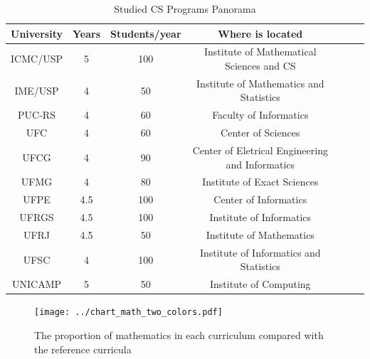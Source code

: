\documentclass{beamer}
\begin{document}
\begin{frame}
\begin{table}
	\scriptsize
	\caption{Studied CS Programs Panorama}
    \begin{tabular}{|c|c|c|c|c|c|c|}
        \hline
        University   & Years & Students/year & Where is located                                   \\ \hline
        \rowcolor{n_green!40}
        ICMC/USP     & 5     & 100   & Institute of Mathematical Sciences and CS        \\ 
        \rowcolor{n_green!40}
        IME/USP      & 4     & 50    & Institute of Mathematics and Statistics          \\ 
        PUC-RS       & 4     & 60    & Faculty of Informatics                           \\ 
        UFC          & 4     & 60    & Center of Sciences                               \\ 
        UFCG         & 4     & 90    & Center of Eletrical Engineering and Informatics  \\ 
        UFMG         & 4     & 80    & Institute of Exact Sciences                      \\ 
        UFPE         & 4.5   & 100   & Center of Informatics                            \\ 
        UFRGS        & 4.5   & 100   & Institute of Informatics                         \\ 
        \rowcolor{n_green!40}
        UFRJ         & 4.5   & 50    & Institute of Mathematics                         \\ 
        UFSC         & 4     & 100   & Institute of Informatics and Statistics          \\ 
        UNICAMP      & 5     & 50    & Institute of Computing                           \\
        \hline
    \end{tabular}
\end{table}
\end{frame}

\begin{frame}
\begin{figure}[!t]
\centering
\texttt{[image: ../chart\_math\_two\_colors.pdf]}
\caption{The proportion of mathematics in each curriculum compared with the reference curricula}
\label{chart_math}
\end{figure}

\end{frame}
\end{document}
